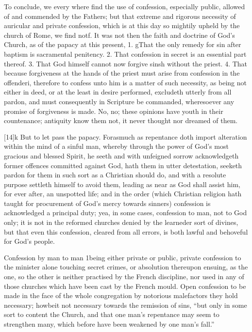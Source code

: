 To conclude, we every where find the use of confession, especially public, allowed of and commended by the Fathers; but that extreme and rigorous necessity of auricular and private confession, which is at this day so mightily upheld by the church of Rome, we find notf. It was not then the faith and doctrine of God’s Church, as of the papacy at this present, 1. gThat the only remedy for sin after baptism is sacramental penitency. 2. That confession in secret is an essential part thereof. 3. That God himself cannot now forgive sinsh without the priest. 4. That because forgiveness at the hands of the priest must arise from confession in the offenderi, therefore to confess unto him is a matter of such necessity, as being not either in deed, or at the least in desire performed, excludeth utterly from all pardon, and must consequently in Scripture be commanded, wheresoever any promise of forgiveness is made. No, no; these opinions have youth in their countenance; antiquity know them not, it never thought nor dreamed of them.

[14]k But to let pass the papacy. Forasmuch as repentance doth import alteration within the mind of a sinful man, whereby through the power of God’s most gracious and blessed Spirit, he seeth and with unfeigned sorrow acknowledgeth former offences committed against God, hath them in utter detestation, seeketh pardon for them in such sort as a Christian should do, and with a resolute purpose settleth himself to avoid them, leading as near as God shall assist him, for ever after, an unspotted life; and in the order (which Christian religion hath taught for procurement of God’s mercy towards sinners) confession is acknowledged a principal duty; yea, in some cases, confession to man, not to God only; it is not in the reformed churches denied by the learneder sort of divines, but that even this confession, cleared from all errors, is both lawful and behoveful for God’s people.


Confession by man to man 1being either private or public, private confession to the minister alone touching secret crimes, or absolution thereupon ensuing, as the one, so the other is neither practised by the French discipline, nor used in any of those churches which have been cast by the French mould. Open confession to be made in the face of the whole congregation by notorious malefactors they hold necessary; howbeit not necessary towards the remission of sins, “but only in some sort to content the Church, and that one man’s repentance may seem to strengthen many, which before have been weakened by one man’s fall.”

